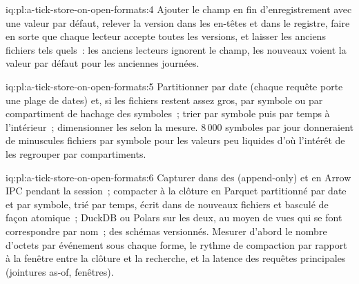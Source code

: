 \begin{solution}{iq:pl:a-tick-store-on-open-formats:4}
Ajouter le champ en fin d'enregistrement avec une valeur par défaut, relever la version dans les en-têtes et dans le registre, faire en sorte que chaque lecteur accepte toutes les
versions, et laisser les anciens fichiers tels quels~: les anciens lecteurs ignorent le champ, les nouveaux voient la valeur par défaut pour les anciennes journées.
\end{solution}

\begin{solution}{iq:pl:a-tick-store-on-open-formats:5}
Partitionner par date (chaque requête porte une plage de dates) et, si les fichiers restent assez gros, par symbole ou par compartiment de hachage des symboles~; trier par
symbole puis par temps à l'intérieur~; dimensionner les  selon la mesure. 8\,000 symboles par jour donneraient de minuscules fichiers par symbole pour les valeurs peu liquides
d'où l'intérêt de les regrouper par compartiments.
\end{solution}

\begin{solution}{iq:pl:a-tick-store-on-open-formats:6}
Capturer dans des  (append-only) et en Arrow IPC pendant la session~; compacter à la clôture en Parquet partitionné par date et
par symbole, trié par temps, écrit dans de nouveaux fichiers et basculé de façon atomique~; DuckDB ou Polars sur les deux, au moyen de vues qui se font correspondre par nom~;
des schémas versionnés. Mesurer d'abord le nombre d'octets par événement sous chaque forme, le rythme de compaction par rapport à la fenêtre entre la clôture et la recherche, et
la latence des requêtes principales (jointures as-of, fenêtres).
\end{solution}
